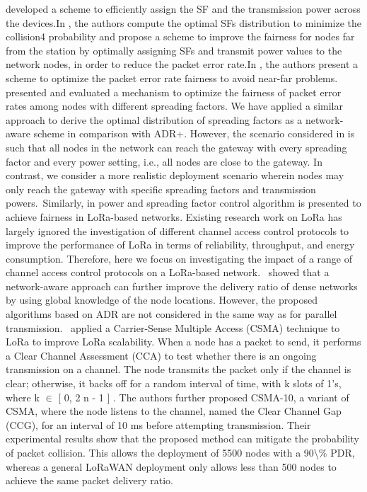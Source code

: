  \cite{reynders_power_2017}   \citet{reynders_power_2017} developed a scheme to efficiently assign the SF and the transmission power across the devices.In \cite{reynders_power_2017}, the authors compute the optimal SFs distribution to minimize the collision4 probability and propose a scheme to improve the fairness for nodes far from the station by optimally assigning SFs and transmit power values to the network nodes, in order to reduce the packet error rate.In \cite{reynders_power_2017}, the authors present a scheme to optimize the packet error rate fairness to avoid near-far problems.~\citet{reynders_power_2017} presented and evaluated a mechanism to optimize the fairness of packet error rates among nodes with different spreading factors. We have applied a similar approach to derive the optimal distribution of spreading factors as a network-aware scheme in comparison with ADR+. However, the scenario considered in \cite{reynders_power_2017} is such that all nodes in the network can reach the gateway with every spreading factor and every power setting, i.e., all nodes are close to the gateway. In contrast, we consider a more realistic deployment scenario wherein nodes may only reach the gateway with specific spreading factors and transmission powers.~Similarly, in \cite{reynders_power_2017} power and spreading factor control algorithm is presented to achieve fairness in LoRa-based networks. Existing research work on LoRa has largely ignored the investigation of different channel access control protocols to improve the performance of LoRa in terms of reliability, throughput, and energy consumption. Therefore, here we focus on investigating the impact of a range of channel access control protocols on a LoRa-based network.~   \newline 
 \cite{slabicki_adaptive_2018}   \citet{slabicki_adaptive_2018} showed that a network-aware approach can further improve the delivery ratio of dense networks by using global knowledge of the node locations. However, the proposed algorithms based on ADR are not considered in the same way as for parallel transmission.~   \newline 
 \cite{to_simulation_2018}   \citet{to_simulation_2018} applied a Carrier-Sense Multiple Access (CSMA) technique to LoRa to improve LoRa scalability. When a node has a packet to send, it performs a Clear Channel Assessment (CCA) to test whether there is an ongoing transmission on a channel. The node transmits the packet only if the channel is clear; otherwise, it backs off for a random interval of time, with k slots of 1's, where k {$\in$} [ 0, 2 n - 1 ] . The authors further proposed CSMA-10, a variant of CSMA, where the node listens to the channel, named the Clear Channel Gap (CCG), for an interval of 10 ms before attempting transmission. Their experimental results show that the proposed method can mitigate the probability of packet collision. This allows the deployment of 5500 nodes with a 90\textbackslash\% PDR, whereas a general LoRaWAN deployment only allows less than 500 nodes to achieve the same packet delivery ratio.~   \newline 
